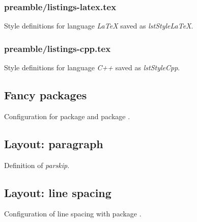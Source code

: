 \subsubsection{preamble/listings-latex.tex}

Style definitions for language \emph{LaTeX} saved as \emph{lstStyleLaTeX}.


\subsubsection{preamble/listings-cpp.tex}

Style definitions for language \emph{C++} saved as \emph{lstStyleCpp}.



\subsection{Fancy packages}

Configuration for package  and package .


\subsection{Layout: paragraph}

Definition of \emph{parskip}.


\subsection{Layout: line spacing}

Configuration of line spacing with package .

